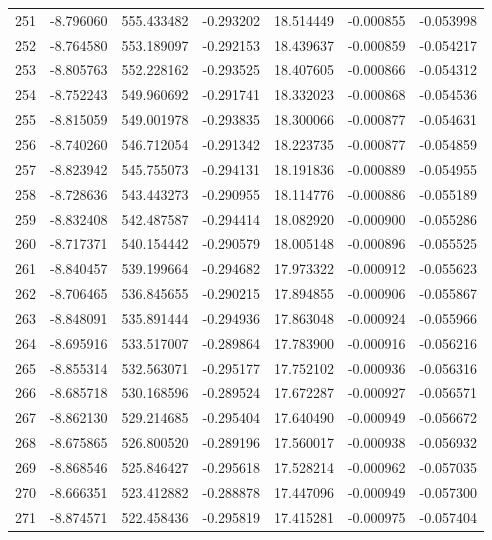 \begin{tabular}{rrrrrrr}
 251 &  -8.796060 &  555.433482 & -0.293202 &   18.514449 &   -0.000855 & -0.053998 \\
 252 &  -8.764580 &  553.189097 & -0.292153 &   18.439637 &   -0.000859 & -0.054217 \\
 253 &  -8.805763 &  552.228162 & -0.293525 &   18.407605 &   -0.000866 & -0.054312 \\
 254 &  -8.752243 &  549.960692 & -0.291741 &   18.332023 &   -0.000868 & -0.054536 \\
 255 &  -8.815059 &  549.001978 & -0.293835 &   18.300066 &   -0.000877 & -0.054631 \\
 256 &  -8.740260 &  546.712054 & -0.291342 &   18.223735 &   -0.000877 & -0.054859 \\
 257 &  -8.823942 &  545.755073 & -0.294131 &   18.191836 &   -0.000889 & -0.054955 \\
 258 &  -8.728636 &  543.443273 & -0.290955 &   18.114776 &   -0.000886 & -0.055189 \\
 259 &  -8.832408 &  542.487587 & -0.294414 &   18.082920 &   -0.000900 & -0.055286 \\
 260 &  -8.717371 &  540.154442 & -0.290579 &   18.005148 &   -0.000896 & -0.055525 \\
 261 &  -8.840457 &  539.199664 & -0.294682 &   17.973322 &   -0.000912 & -0.055623 \\
 262 &  -8.706465 &  536.845655 & -0.290215 &   17.894855 &   -0.000906 & -0.055867 \\
 263 &  -8.848091 &  535.891444 & -0.294936 &   17.863048 &   -0.000924 & -0.055966 \\
 264 &  -8.695916 &  533.517007 & -0.289864 &   17.783900 &   -0.000916 & -0.056216 \\
 265 &  -8.855314 &  532.563071 & -0.295177 &   17.752102 &   -0.000936 & -0.056316 \\
 266 &  -8.685718 &  530.168596 & -0.289524 &   17.672287 &   -0.000927 & -0.056571 \\
 267 &  -8.862130 &  529.214685 & -0.295404 &   17.640490 &   -0.000949 & -0.056672 \\
 268 &  -8.675865 &  526.800520 & -0.289196 &   17.560017 &   -0.000938 & -0.056932 \\
 269 &  -8.868546 &  525.846427 & -0.295618 &   17.528214 &   -0.000962 & -0.057035 \\
 270 &  -8.666351 &  523.412882 & -0.288878 &   17.447096 &   -0.000949 & -0.057300 \\
 271 &  -8.874571 &  522.458436 & -0.295819 &   17.415281 &   -0.000975 & -0.057404 \\

\end{tabular}
